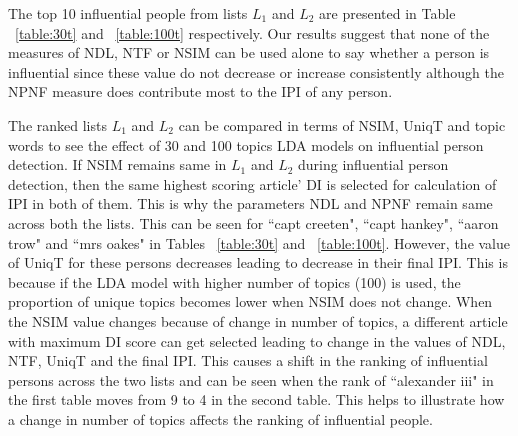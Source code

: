 
The top 10 influential people from lists $L_1$ and $L_2$ are presented in Table ~\ref{table:30t} and ~\ref{table:100t} respectively. 
Our results suggest that none of the measures of NDL, NTF or NSIM can be used alone to say whether a person is influential since these value do not decrease or increase consistently although the NPNF measure does contribute most to the IPI of any person.

The ranked lists $L_1$ and $L_2$ can be compared in terms of NSIM, UniqT and topic words to see the effect of 30 and 100 topics LDA models on influential person detection.
 If NSIM remains same in $L_1$ and $L_2$ during influential person detection, then the same highest scoring article' DI is selected for calculation of IPI in both of them. This is why the parameters NDL and NPNF remain same across both the lists. This can be seen for ``capt creeten", ``capt hankey", ``aaron trow" and ``mrs oakes" in Tables ~\ref{table:30t} and ~\ref{table:100t}. However, the value of UniqT for these persons decreases leading to decrease in their final IPI. This is because if the LDA model with higher number of topics (100) is used, the proportion of unique topics becomes lower when NSIM does not change. When the NSIM value changes because of change in number of topics, a different article with maximum DI score can get selected leading to change in the values of NDL, NTF, UniqT and the final IPI. This causes a shift in the ranking of influential persons across the two lists and can be seen when the rank of ``alexander iii" in the first table moves from 9 to 4 in the second table. 
This helps to illustrate how a change in number of topics affects the ranking of influential people.

